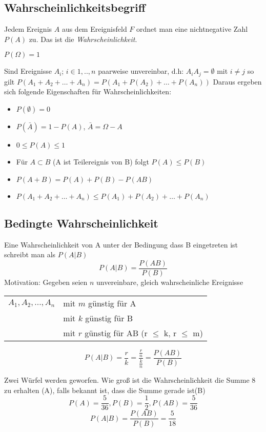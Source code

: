 \subsection{Wahrscheinlichkeitsbegriff}
\begin{axiom}
	Jedem Ereignis $A$ aus dem Ereignisfeld $F$ ordnet man eine nichtnegative Zahl $P(A)$ zu. Das ist die \textit{Wahrscheinlichkeit}.
\end{axiom}
\begin{axiom}
	 $P(\Omega)=1$
\end{axiom}
\begin{axiom}
	Sind Ereignisse $A_i$; $i\in {1,..,n}$ paarweise unvereinbar, d.h: $A_i A_j = \emptyset$ mit $i \neq j $ so gilt $P(A_1+A_2+ \ldots + A_n) = P(A_1+P(A_2)+\ldots+P(A_n) )$ Daraus ergeben sich folgende Eigenschaften für Wahrscheinlichkeiten:
	\begin{itemize}
		\item $P(\emptyset)= 0$
		\item $P(\bar{A}) = 1 - P(A)$, $\bar{A} = \Omega -A$
		\item $ 0 \leq P(A) \leq 1$
		\item Für $A \subset B$ (A ist Teilereignis von B) folgt $P(A) \leq P(B)$
		\item $P(A+B) = P(A)+P(B)-P(AB)$
		\item  $P(A_1 + A_2+ \ldots +A_n) \leq P(A_1) + P(A_2)+ \ldots+P(A_n)$
	\end{itemize} 	
\end{axiom}

\subsection{Bedingte Wahrscheinlichkeit}
Eine Wahrscheinlichkeit von A unter der Bedingung dass B eingetreten ist schreibt man als $P(A|B)$
\[P(A|B) = \frac{P(AB)}{P(B)}\]
Motivation: Gegeben seien $n$ unvereinbare, gleich wahrscheinliche Ereignisse \\
\begin{tabular}{ll}
  $A_1,A_2,...,A_n$ & mit $m$ günstig für A \\
 & mit $k$ günstig für B \\ 
 & mit $r$ günstig für AB (r $\leq$ k, r $\leq$ m) \\ 
\end{tabular}
\[ P(A|B)=\frac{r}{k}=\frac{\frac{r}{n}}{\frac{k}{n}}=\frac{P(AB)}{P(B)} \]

\begin{exmp}
	Zwei Würfel werden geworfen. Wie groß ist die Wahrscheinlichkeit die Summe 8 zu erhalten (A), falls bekannt ist, dass die Summe gerade ist(B)\\
	\[ P(A)=\frac{5}{36}, P(B)=\frac{1}{2}, P(AB)=\frac{5}{36} \]
	\[ P(A|B)=\frac{P(AB)}{P(B)}=\frac{5}{18} \]
\end{exmp}


